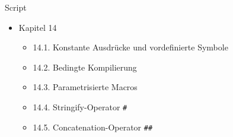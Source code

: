 
\begin{frame}[t,plain]
\titlepage
\end{frame}


\begin{frame}{Script}
%
\begin{itemize}
\item Kapitel 14
	\begin{itemize}
	\item 14.1. Konstante Ausdrücke und vordefinierte Symbole
	\item 14.2. Bedingte Kompilierung
	\item 14.3. Parametrisierte Macros
	\item 14.4. Stringify-Operator \texttt{\#}
	\item 14.5. Concatenation-Operator \texttt{\#\#}
	\end{itemize}
\end{itemize}
%
\end{frame}



